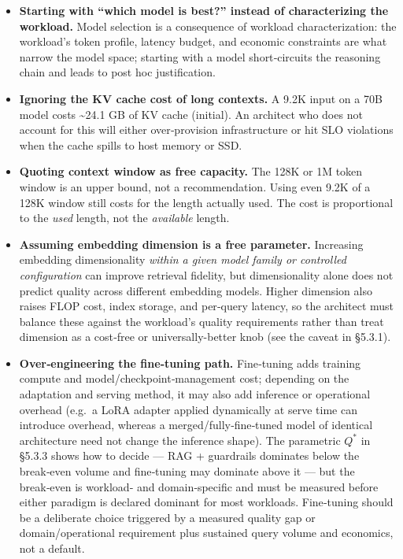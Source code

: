 \begin{itemize}
\item
  \textbf{Starting with ``which model is best?'' instead of
  characterizing the workload.} Model selection is a consequence of
  workload characterization: the workload's token profile, latency
  budget, and economic constraints are what narrow the model space;
  starting with a model short‑circuits the reasoning chain and leads to
  post hoc justification.
\item
  \textbf{Ignoring the KV cache cost of long contexts.} A 9.2K input on
  a 70B model costs \textasciitilde24.1 GB of KV cache (initial). An
  architect who does not account for this will either over‑provision
  infrastructure or hit SLO violations when the cache spills to host
  memory or SSD.
\item
  \textbf{Quoting context window as free capacity.} The 128K or 1M token
  window is an upper bound, not a recommendation. Using even 9.2K of a
  128K window still costs for the length actually used. The cost is
  proportional to the \emph{used} length, not the \emph{available}
  length.
\item
  \textbf{Assuming embedding dimension is a free parameter.} Increasing
  embedding dimensionality \emph{within a given model family or
  controlled configuration} can improve retrieval fidelity, but
  dimensionality alone does not predict quality across different
  embedding models. Higher dimension also raises FLOP cost, index
  storage, and per‑query latency, so the architect must balance these
  against the workload's quality requirements rather than treat
  dimension as a cost‑free or universally-better knob (see the caveat in
  §5.3.1).
\item
  \textbf{Over‑engineering the fine‑tuning path.} Fine‑tuning adds
  training compute and model/checkpoint‑management cost; depending on
  the adaptation and serving method, it may also add inference or
  operational overhead (e.g.~a LoRA adapter applied dynamically at serve
  time can introduce overhead, whereas a merged/fully‑fine‑tuned model
  of identical architecture need not change the inference shape). The
  parametric \(Q^*\) in §5.3.3 shows how to decide --- RAG + guardrails
  dominates below the break‑even volume and fine‑tuning may dominate
  above it --- but the break‑even is workload‑ and domain‑specific and
  must be measured before either paradigm is declared dominant for most
  workloads. Fine‑tuning should be a deliberate choice triggered by a
  measured quality gap or domain/operational requirement plus sustained
  query volume and economics, not a default.
\end{itemize}

